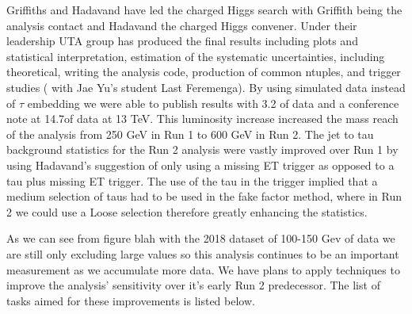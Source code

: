 Griffiths and Hadavand have led the charged Higgs search with Griffith being the analysis contact and Hadavand the charged Higgs convener.  Under their leadership UTA group has produced the final results including plots and statistical
interpretation, estimation of the systematic uncertainties, including theoretical, writing the analysis code, production of common ntuples, and trigger studies ( with Jae Yu's student Last Feremenga).  
By using simulated \ttbar data instead of $\tau$ embedding we were able to publish results with 3.2 \invfb of data and a conference note at 14.7\invfb of data at 13 TeV.  This luminosity increase increased the mass reach of the analysis from 250 GeV in Run 1 to 600 GeV in Run 2.
The jet to tau background statistics for the Run 2 analysis were vastly improved over Run 1 by using Hadavand's suggestion of only using a missing ET trigger as opposed to a tau plus missing ET trigger.  The use of the tau in the trigger implied that a medium selection of taus had to be used in the fake factor method, 
where in Run 2 we could use a Loose selection therefore greatly enhancing the statistics.

As we can see from figure blah with the 2018 dataset of 100-150 Gev of data we are still only excluding large \tanb values so this analysis continues to be an important measurement as we accumulate more data.
We have plans to apply techniques to improve the analysis' sensitivity over it's early Run 2 predecessor.  The list of tasks aimed for these improvements is listed below.




